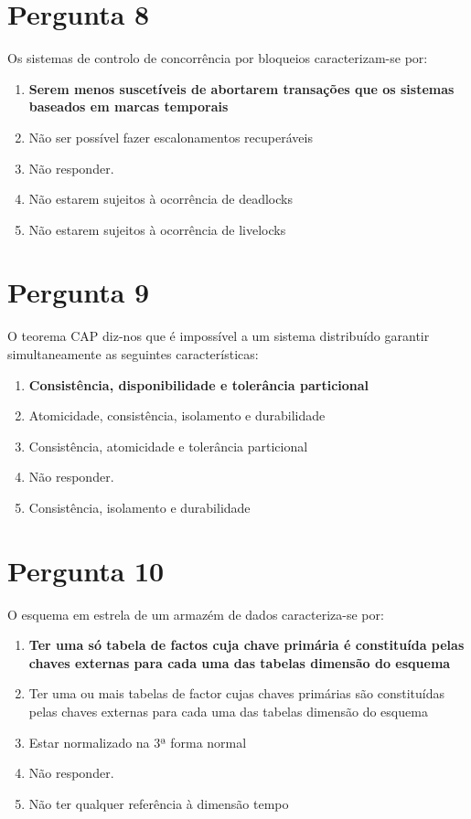 {\section{Pergunta 8}
Os sistemas de controlo de concorrência por bloqueios caracterizam-se por:
\begin{enumerate}[label=\alph*.]\itemsep0em
    \item \textbf{Serem menos suscetíveis de abortarem transações que os sistemas baseados em marcas temporais \greencheckmark}
    \item Não ser possível fazer escalonamentos recuperáveis
    \item Não responder.
    \item Não estarem sujeitos à ocorrência de deadlocks
    \item Não estarem sujeitos à ocorrência de livelocks
\end{enumerate}

\section{Pergunta 9}
O teorema CAP diz-nos que é impossível a um sistema distribuído garantir simultaneamente as seguintes características:
\begin{enumerate}[label=\alph*.]\itemsep0em
    \item \textbf{Consistência, disponibilidade e tolerância particional \greencheckmark}
    \item Atomicidade, consistência, isolamento e durabilidade
    \item Consistência, atomicidade e tolerância particional
    \item Não responder.
    \item Consistência, isolamento e durabilidade
\end{enumerate}

\section{Pergunta 10}
O esquema em estrela de um armazém de dados caracteriza-se por:
\begin{enumerate}[label=\alph*.]\itemsep0em
    \item \textbf{Ter uma só tabela de factos cuja chave primária é constituída pelas chaves externas para cada uma das tabelas dimensão do esquema \greencheckmark}
    \item Ter uma ou mais tabelas de factor cujas chaves primárias são constituídas pelas chaves externas para cada uma das tabelas dimensão do esquema
    \item Estar normalizado na 3ª forma normal
    \item Não responder.
    \item Não ter qualquer referência à dimensão tempo
\end{enumerate}

}

